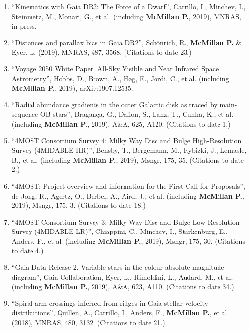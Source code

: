\documentclass{resume}
\begin{document}
\begin{enumerate}
\item ``Kinematics with Gaia DR2: The Force of a Dwarf'', Carrillo, I., Minchev, I., Steinmetz, M., Monari, G., et al. (including \textbf{McMillan P.}, 2019), MNRAS, in press.

\item ``Distances and parallax bias in Gaia DR2'', Sch\"onrich, R., \textbf{McMillan P.} \& Eyer, L. (2019), MNRAS, 487, 3568. (Citations to date 23.)

\item ``Voyage 2050 White Paper: All-Sky Visible and Near Infrared Space Astrometry'', Hobbs, D., Brown, A., H{\o}g, E., Jordi, C., et al. (including \textbf{McMillan P.}, 2019), arXiv:1907.12535.

\item ``Radial abundance gradients in the outer Galactic disk as traced by main-sequence OB stars'', Bragan\c{c}a, G., Daflon, S., Lanz, T., Cunha, K., et al. (including \textbf{McMillan P.}, 2019), A\&A, 625, A120. (Citations to date 1.)

\item ``4MOST Consortium Survey 4: Milky Way Disc and Bulge High-Resolution Survey (4MIDABLE-HR)'', Bensby, T., Bergemann, M., Rybizki, J., Lemasle, B., et al. (including \textbf{McMillan P.}, 2019), Msngr, 175, 35. (Citations to date 2.)

\item ``4MOST: Project overview and information for the First Call for Proposals'', de Jong, R., Agertz, O., Berbel, A., Aird, J., et al. (including \textbf{McMillan P.}, 2019), Msngr, 175, 3. (Citations to date 18.)

\item ``4MOST Consortium Survey 3: Milky Way Disc and Bulge Low-Resolution Survey (4MIDABLE-LR)'', Chiappini, C., Minchev, I., Starkenburg, E., Anders, F., et al. (including \textbf{McMillan P.}, 2019), Msngr, 175, 30. (Citations to date 4.)

\item ``Gaia Data Release 2. Variable stars in the colour-absolute magnitude diagram'', Gaia Collaboration, Eyer, L., Rimoldini, L., Audard, M., et al. (including \textbf{McMillan P.}, 2019), A\&A, 623, A110. (Citations to date 34.)

\item ``Spiral arm crossings inferred from ridges in Gaia stellar velocity distributions'', Quillen, A., Carrillo, I., Anders, F., \textbf{McMillan P.}, et al. (2018), MNRAS, 480, 3132. (Citations to date 21.)


\end{enumerate}
\end{document}
